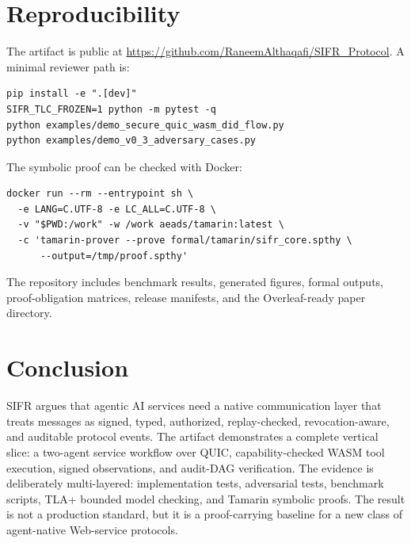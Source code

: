 \documentclass[runningheads]{llncs}
\begin{document}
\section{Reproducibility}

The artifact is public at \url{https://github.com/RaneemAlthaqafi/SIFR_Protocol}. A minimal reviewer path is:
\begin{lstlisting}
pip install -e ".[dev]"
SIFR_TLC_FROZEN=1 python -m pytest -q
python examples/demo_secure_quic_wasm_did_flow.py
python examples/demo_v0_3_adversary_cases.py
\end{lstlisting}

The symbolic proof can be checked with Docker:
\begin{lstlisting}
docker run --rm --entrypoint sh \
  -e LANG=C.UTF-8 -e LC_ALL=C.UTF-8 \
  -v "$PWD:/work" -w /work aeads/tamarin:latest \
  -c 'tamarin-prover --prove formal/tamarin/sifr_core.spthy \
      --output=/tmp/proof.spthy'
\end{lstlisting}

The repository includes benchmark results, generated figures, formal outputs, proof-obligation matrices, release manifests, and the Overleaf-ready paper directory.

\section{Conclusion}

SIFR argues that agentic AI services need a native communication layer that treats messages as signed, typed, authorized, replay-checked, revocation-aware, and auditable protocol events. The artifact demonstrates a complete vertical slice: a two-agent service workflow over QUIC, capability-checked WASM tool execution, signed observations, and audit-DAG verification. The evidence is deliberately multi-layered: implementation tests, adversarial tests, benchmark scripts, TLA+ bounded model checking, and Tamarin symbolic proofs. The result is not a production standard, but it is a proof-carrying baseline for a new class of agent-native Web-service protocols.



\end{document}
